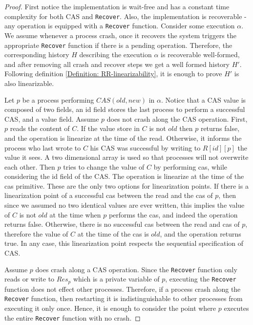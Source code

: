 \begin{proof}
	
	First notice the implementation is wait-free and has a constant time complexity for both CAS and \texttt{Recover}. Also, the implementation is recoverable - any operation is equipped with a \texttt{Recover} function.
	Consider some execution $\alpha$. We assume whenever a process crash, once it recovers the system triggers the appropriate \texttt{Recover} function if there is a pending operation. Therefore, the corresponding history $H$ describing the execution $\alpha$ is recoverable well-formed, and after removing all crash and recover steps we get a well formed history $H'$. Following definition \ref{Definition: RR-linearizability}, it is enough to prove $H'$ is also linearizable.
	
	Let $p$ be a process performing $CAS(old,new)$ in $\alpha$. Notice that a CAS value is composed of two fields, an id field stores the last process to perform a successful CAS, and a value field.
	Assume $p$ does not crash along the CAS operation.
	First, $p$ reads the content of $C$. If the value store in $C$ is not $old$ then $p$ returns false, and the operation is linearize at the time of the read. Otherwise, it informs the process who last wrote to $C$ his CAS was successful by writing to $R[id][p]$ the value it sees. A two dimensional array is used so that processes will not overwrite each other. Then $p$ tries to change the value of $C$ by performing cas, while considering the id field of the CAS. The operation is linearize at the time of the cas primitive. These are the only two options for linearization points. If there is a linearization point of a successful cas between the read and the cas of $p$, then since we assumed no two identical values are ever written, this implies the value of $C$ is not $old$ at the time when $p$ performs the cas, and indeed the operation returns false. Otherwise, there is no successful cas between the read and cas of $p$, therefore the value of $C$ at the time of the cas is $old$, and the operation returns true. In any case, this linearization point respects the sequential specification of CAS.
	 
	Assume $p$ does crash along a CAS operation. Since the \texttt{Recover} function only reads or write to $Res_p$ which is a private variable of $p$, executing the \texttt{Recover} function does not effect other processes. Therefore, if a process crash along the \texttt{Recover} function, then restarting it is indistinguishable to other processes from executing it only once. Hence, it is enough to consider the point where $p$ executes the entire \texttt{Recover} function with no crash.
	

\end{proof}
